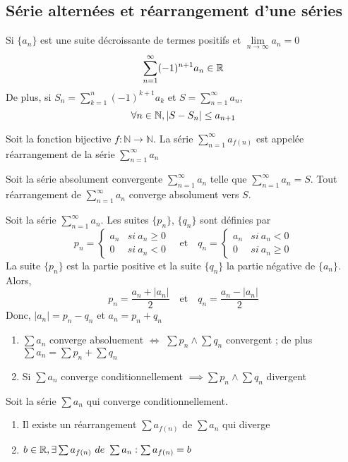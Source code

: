 	\subsection{Série alternées et réarrangement d'une séries}
		\begin{mythm}
			Si $\{a_n\}$ est une suite décroissante de termes positifs et $\lim\limits_{n\to\infty}a_n=0$
			\[\sum_{n=1}^{\infty}(-1)^{n+1}a_n\in\mathbb{R}\]
			De plus, si $S_n=\sum_{k=1}^n (-1)^{k+1}a_k$ et $S=\sum_{n=1}^{\infty}a_n$, \[\forall n\in\mathbb{N}, |S-S_n|\leq a_{n+1}\]
		\end{mythm}
		\begin{mydef}
			Soit la fonction bijective $f:\mathbb{N}\longrightarrow\mathbb{N}$. La série $\sum_{n=1}^{\infty}a_{f(n)}$ est appelée réarrangement de la série $\sum_{n=1}^{\infty}a_n$
		\end{mydef}
		\begin{mythm}
			Soit la série absolument convergente $\sum_{n=1}^{\infty}a_n$ telle que $\sum_{n=1}^{\infty}a_n=S$. Tout réarrangement de $\sum_{n=1}^{\infty}a_n$ converge absolument vers $S$.
		\end{mythm}
		\begin{mythm}
			Soit la série $\sum_{n=1}^{\infty}a_n$. Les suites $\{p_n\}$, $\{q_n\}$ sont définies par \[p_n=\begin{cases}
			a_n&si~a_n\geq 0\\
			0&si~a_n<0
			\end{cases}\quad\text{et}\quad q_n=\begin{cases}
			a_n&si~a_n< 0\\
			0&si~a_n\geq0
			\end{cases}\] 
			La suite $\{p_n\}$ est la partie positive et la suite $\{q_n\}$ la partie négative de $\{a_n\}$. Alors,
			\[p_n=\frac{a_n+|a_n|}{2}\quad\text{et}\quad q_n=\frac{a_n-|a_n|}{2}\]
			Donc, $|a_n|=p_n-q_n$ et $a_n=p_n+q_n$
			\begin{enumerate}[label=\alph*)]
				\item $\sum a_n$ converge absoluement $\Longleftrightarrow$ $\sum p_n\wedge\sum q_n$ convergent ; de plus $\sum a_n=\sum p_n +\sum q_n$
				\item Si $\sum a_n$ converge conditionnellement $\implies\sum p_n\wedge\sum q_n$ divergent
			\end{enumerate}
		\end{mythm}
		\begin{mythm}\index{Théoème de Riemann}
			Soit la série $\sum a_n$ qui converge conditionnellement.\begin{enumerate}[label=\alph*)]
				\item Il existe un réarrangement $\sum a_{f(n)}$ de $\sum a_n$ qui diverge
				\item $b\in\mathbb{R},\exists \sum a_{f(n)}~de~\sum a_n : \sum a_{f(n)}=b$ 
			\end{enumerate}
		\end{mythm}
